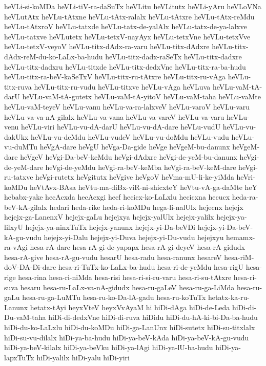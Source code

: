 {heVLi-si-koMDa
heVLi-tiV-ra-daSuTx
heVLitu
heVLitutx
heVLi-yAru
heVLoVNa
heVLutAtx
heVLu-tAtxne
heVLu-tAtx-ralalx
heVLu-tAtxre
heVLu-tAtx-reMdu
heVLu-tAtxroV
heVLu-tatxde
heVLu-tatx-de-yalAlx
heVLu-tatx-de-ya-lalxve
heVLu-tatxve
heVLutetx
heVLu-tetxV-nayAyx
heVLu-tetxVne
heVLu-tetxVve
heVLu-tetxV-veyoV
heVLu-titx-dAdx-ra-varu
heVLu-titx-dAdxre
heVLu-titx-dAdx-reM-du-ko-LaLx-ba-hudu
heVLu-titx-dadx-raSeTx
heVLu-titx-dadxre
heVLu-titx-dadxru
heVLu-titxde
heVLu-titx-dedxVne
heVLu-titx-ra-ba-hudu
heVLu-titx-ra-beV-kaSeTxV
heVLu-titx-ru-tAtxre
heVLu-titx-ru-vAga
heVLu-titx-ruva
heVLu-titx-ru-vudu
heVLu-titxve
heVLu-vAga
heVLuva
heVLu-vaM-tA-darU
heVLu-vaM-tA-gutetx
heVLu-vaM-tA-yitoV
heVLu-vaM-taha
heVLu-vaMte
heVLu-vaM-teyeV
heVLu-vanu
heVLu-va-ra-lalxveV
heVLu-varoV
heVLu-varu
heVLu-va-va-nA-gilalx
heVLu-va-vana
heVLu-va-vareV
heVLu-va-varu
heVLu-venu
heVLu-viri
heVLu-vu-dA-darU
heVLu-vu-dA-dare
heVLu-vudU
heVLu-vu-dakUkx
heVLu-vu-deMdu
heVLu-vudeV
heVLu-vu-doMdu
heVLu-vudu
heVLu-vu-duMTu
heVgA-dare
heVgU
heVga-Da-gide
heVge
heVgeM-bu-danunx
heVgeM-dare
heVgeV
heVgi-Da-beV-keMdu
heVgi-dAdxre
heVgi-de-yeM-bu-danunx
heVgi-de-yeM-dare
heVgi-de-yeMdu
heVgi-ra-beV-keMba
heVgi-ra-beV-keM-dare
heVgi-ru-tatxve
heVgi-rutetx
heVgitutx
heVgive
heVgoV
heVma-mU-li-ke-yiMda
heVri-koMDu
heVtAvx-BAsa
heVtu-ma-diBx-viR-ni-shicxteY
heVtu-vA-ga-daMte
heY
hebabx-yake
hecAcxda
hecAcxgi
hecf
hecicx-ko-LaLxlu
hecicxna
hecucx
heda-ra-beV-kA-gilalx
hedari
heda-rike
heda-ri-koMDu
hega-li-nalUlx
hejecnx
hejejx
hejejx-ga-LanenxV
hejejx-gaLu
hejejxya
hejejx-yalUlx
hejejx-yalilx
hejejx-ya-lilxyU
hejejx-ya-ninxTuTx
hejejx-yanunx
hejejx-yi-Da-beVDi
hejejx-yi-Da-beV-kA-gu-vudu
hejejx-yi-Dalu
hejejx-yi-Duva
hejejx-yi-Du-vudu
hejejxyu
hemamx-ra-vAgi
hesa-rA-dare
hesa-rA-gi-de-yapapx
hesa-rA-gi-deyeV
hesa-rA-gidudx
hesa-rA-give
hesa-rA-gu-vudu
hesarU
hesa-radu
hesa-ranunx
hesareV
hesa-riM-doV-DA-Di-dare
hesa-ri-TuTx-ko-LaLx-ba-hudu
hesa-ri-de-yeMdu
hesa-rigU
hesa-rige
hesa-rina
hesa-ri-niMda
hesa-risi
hesa-ri-si-ru-varu
hesa-ri-su-tAtxre
hesa-ri-suva
hesaru
hesa-ru-LaLx-va-nA-gidudx
hesa-ru-gaLeV
hesa-ru-ga-LiMda
hesa-ru-gaLu
hesa-ru-ga-LuMTu
hesa-ru-ko-Da-lA-gadu
hesa-ru-koTuTx
hetatx-ka-ru-Lanunx
hetatx-tAyi
heyxVteV
heyxVvAyaM
hi
hiDi-dAga
hiDi-de-Leda
hiDi-di-Du-vaM-taha
hiDi-di-dedxVne
hiDi-di-ruva
hiDidu
hiDi-du-hA-ki-bi-Da-ba-hudu
hiDi-du-ko-LaLxlu
hiDi-du-koMDu
hiDi-ga-LanUnx
hiDi-sutetx
hiDi-su-titxlalx
hiDi-su-vu-dilalx
hiDi-ya-ba-hudu
hiDi-ya-beV-kAda
hiDi-ya-beV-kA-gu-vudu
hiDi-ya-beV-kilalx
hiDi-ya-beVku
hiDi-ya-lAgi
hiDi-ya-lU-ba-hudu
hiDi-ya-lapxTuTx
hiDi-yalilx
hiDi-yalu
hiDi-yiri
}
